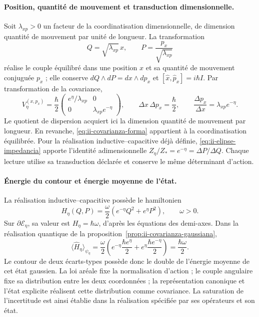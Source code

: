 \paragraph{Position, quantité de mouvement et transduction dimensionnelle.}
Soit \(\lambda_{xp}>0\) un facteur de la coordinatisation dimensionnelle, de dimension
quantité de mouvement par unité de longueur. La transformation
\[
 Q=\sqrt{\lambda_{xp}}\,x,\qquad
 P=\frac{p_x}{\sqrt{\lambda_{xp}}}
\]
réalise le couple équilibré dans une position \(x\) et sa quantité de mouvement conjuguée
\(p_x\) ; elle conserve \(dQ\wedge dP=dx\wedge dp_x\) et
\([\widehat x,\widehat p_x]=i\hbar I\). Par transformation de la
covariance,
\begin{equation}
 V_\eta^{(x,p_x)}=\frac{\hbar}{2}
 \begin{pmatrix}e^\eta/\lambda_{xp}&0\\
                 0&\lambda_{xp}e^{-\eta}\end{pmatrix},\qquad
 \Delta x\,\Delta p_x=\frac{\hbar}{2},\qquad
 \frac{\Delta p_x}{\Delta x}=\lambda_{xp}e^{-\eta}.
 \label{eq:ii-covarianza-dimensiones}
\end{equation}
Le quotient de dispersion acquiert ici la dimension quantité de mouvement par longueur.
En revanche, \eqref{eq:ii-covarianza-forma} appartient à la coordinatisation équilibrée.
Pour la réalisation inductive--capacitive déjà définie,
\eqref{eq:ii-elipse-impedancia} apporte l’identité adimensionnelle
\(Z_\eta/Z_*=e^{-\eta}=\Delta P/\Delta Q\).
Chaque lecture utilise sa transduction déclarée et conserve le même
déterminant d’action.

\paragraph{Énergie du contour et énergie moyenne de l'état.}
La réalisation inductive--capacitive possède le hamiltonien
\[
 H_\eta(Q,P)=\frac{\omega}{2}
 \left(e^{-\eta}Q^2+e^\eta P^2\right),\qquad \omega>0.
\]
Sur \(\partial\mathcal E_\eta\), sa valeur est
\(H_\eta=\hbar\omega\), d'après les équations des demi-axes. Dans la
réalisation quantique de la proposition~\ref{prop:ii-covarianza-gaussiana},
\begin{equation}
 \langle\widehat H_\eta\rangle_{\psi_\eta}
 =\frac{\omega}{2}
 \left(e^{-\eta}\frac{\hbar e^\eta}{2}
       +e^\eta\frac{\hbar e^{-\eta}}{2}\right)
 =\frac{\hbar\omega}{2}.
 \label{eq:ii-energia-contorno-covarianza}
\end{equation}
Le contour de deux écarts-types possède donc le double de
l'énergie moyenne de cet état gaussien. La loi aréale fixe la normalisation
d'action ; le couple angulaire fixe sa distribution entre les deux coordonnées ;
la représentation canonique et l'état explicite réalisent cette distribution
comme covariance. La saturation de l'incertitude est ainsi établie dans
la réalisation spécifiée par ses opérateurs et son état.
